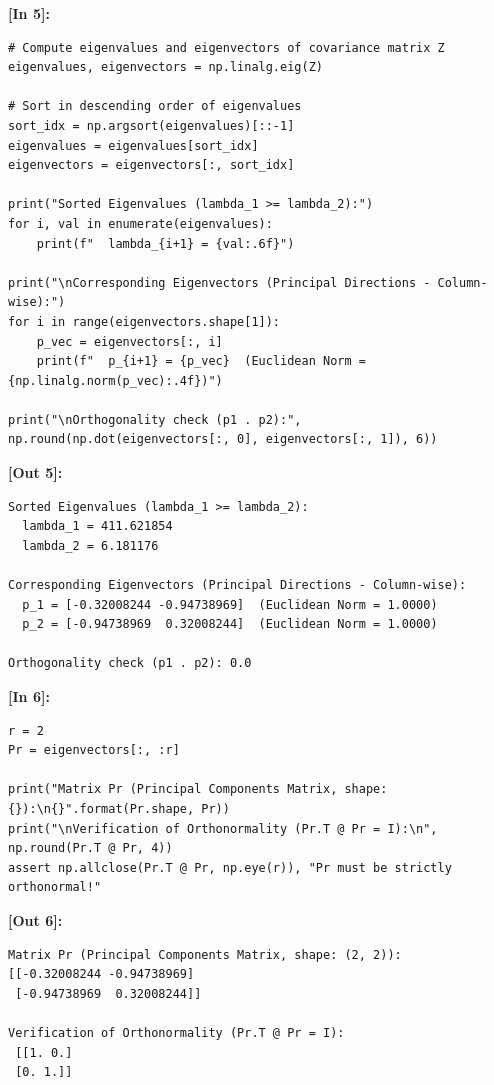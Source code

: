 \vspace{0.6em}
\noindent\textbf{\small [In 5]:}
\begin{lstlisting}[style=pycode]
# Compute eigenvalues and eigenvectors of covariance matrix Z
eigenvalues, eigenvectors = np.linalg.eig(Z)

# Sort in descending order of eigenvalues
sort_idx = np.argsort(eigenvalues)[::-1]
eigenvalues = eigenvalues[sort_idx]
eigenvectors = eigenvectors[:, sort_idx]

print("Sorted Eigenvalues (lambda_1 >= lambda_2):")
for i, val in enumerate(eigenvalues):
    print(f"  lambda_{i+1} = {val:.6f}")

print("\nCorresponding Eigenvectors (Principal Directions - Column-wise):")
for i in range(eigenvectors.shape[1]):
    p_vec = eigenvectors[:, i]
    print(f"  p_{i+1} = {p_vec}  (Euclidean Norm = {np.linalg.norm(p_vec):.4f})")

print("\nOrthogonality check (p1 . p2):", np.round(np.dot(eigenvectors[:, 0], eigenvectors[:, 1]), 6))
\end{lstlisting}
\noindent\textbf{\small [Out 5]:}
\begin{lstlisting}[style=output]
Sorted Eigenvalues (lambda_1 >= lambda_2):
  lambda_1 = 411.621854
  lambda_2 = 6.181176

Corresponding Eigenvectors (Principal Directions - Column-wise):
  p_1 = [-0.32008244 -0.94738969]  (Euclidean Norm = 1.0000)
  p_2 = [-0.94738969  0.32008244]  (Euclidean Norm = 1.0000)

Orthogonality check (p1 . p2): 0.0
\end{lstlisting}

\vspace{0.6em}
\noindent\textbf{\small [In 6]:}
\begin{lstlisting}[style=pycode]
r = 2
Pr = eigenvectors[:, :r]

print("Matrix Pr (Principal Components Matrix, shape: {}):\n{}".format(Pr.shape, Pr))
print("\nVerification of Orthonormality (Pr.T @ Pr = I):\n", np.round(Pr.T @ Pr, 4))
assert np.allclose(Pr.T @ Pr, np.eye(r)), "Pr must be strictly orthonormal!"
\end{lstlisting}
\noindent\textbf{\small [Out 6]:}
\begin{lstlisting}[style=output]
Matrix Pr (Principal Components Matrix, shape: (2, 2)):
[[-0.32008244 -0.94738969]
 [-0.94738969  0.32008244]]

Verification of Orthonormality (Pr.T @ Pr = I):
 [[1. 0.]
 [0. 1.]]
\end{lstlisting}

